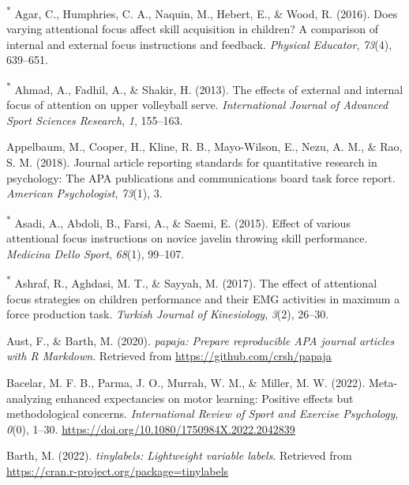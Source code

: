 \documentclass[
  man, donotrepeattitle,floatsintext]{apa7}
\newlength{\cslhangindent}
\newlength{\cslentryspacingunit} %
\newenvironment{CSLReferences}[2] %
 {%
  \setlength{\parindent}{0pt}
  \ifodd #1
  \let\oldpar\par
  \def\par{\hangindent=\cslhangindent\oldpar}
  \fi
  \setlength{\parskip}{#2\cslentryspacingunit}
 }%
 {}
\begin{document}
\begin{CSLReferences}{1}{0}
\leavevmode{}%
\textsuperscript{*} Agar, C., Humphries, C. A., Naquin, M., Hebert, E., \& Wood, R. (2016). Does varying attentional focus affect skill acquisition in children? A comparison of internal and external focus instructions and feedback. \emph{Physical Educator}, \emph{73}(4), 639--651.

\leavevmode{}%
\textsuperscript{*} Ahmad, A., Fadhil, A., \& Shakir, H. (2013). The effects of external and internal focus of attention on upper volleyball serve. \emph{International Journal of Advanced Sport Sciences Research}, \emph{1}, 155--163.

\leavevmode{}%
Appelbaum, M., Cooper, H., Kline, R. B., Mayo-Wilson, E., Nezu, A. M., \& Rao, S. M. (2018). Journal article reporting standards for quantitative research in psychology: The APA publications and communications board task force report. \emph{American Psychologist}, \emph{73}(1), 3.

\leavevmode{}%
\textsuperscript{*} Asadi, A., Abdoli, B., Farsi, A., \& Saemi, E. (2015). Effect of various attentional focus instructions on novice javelin throwing skill performance. \emph{Medicina Dello Sport}, \emph{68}(1), 99--107.

\leavevmode{}%
\textsuperscript{*} Ashraf, R., Aghdasi, M. T., \& Sayyah, M. (2017). The effect of attentional focus strategies on children performance and their EMG activities in maximum a force production task. \emph{Turkish Journal of Kinesiology}, \emph{3}(2), 26--30.

\leavevmode{}%
Aust, F., \& Barth, M. (2020). \emph{{papaja}: {Prepare} reproducible {APA} journal articles with {R Markdown}}. Retrieved from \url{https://github.com/crsh/papaja}

\leavevmode{}%
Bacelar, M. F. B., Parma, J. O., Murrah, W. M., \& Miller, M. W. (2022). Meta-analyzing enhanced expectancies on motor learning: Positive effects but methodological concerns. \emph{International Review of Sport and Exercise Psychology}, \emph{0}(0), 1--30. \url{https://doi.org/10.1080/1750984X.2022.2042839}

\leavevmode{}%
Barth, M. (2022). \emph{{tinylabels}: Lightweight variable labels}. Retrieved from \url{https://cran.r-project.org/package=tinylabels}


\end{CSLReferences}
\end{document}
